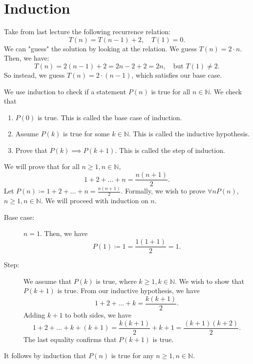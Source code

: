 
\section{Induction}

\begin{eg}
	Take from last lecture the following recurrence relation: \[
		T(n) = T(n - 1) + 2, \quad T(1) = 0
	.\] 
	We can "guess" the solution by looking at the relation. We guess \( T(n) = 2 \cdot n \). Then, we have: \[
		T(n) = 2(n - 1) + 2 = 2n - 2 + 2 = 2n, \quad \text{but } T(1) \neq  2
	.\] 
	So instead, we guess \( T(n) = 2 \cdot (n-1) \), which satisfies our base case.
\end{eg}

We use induction to check if a statement \( P(n) \) is true for all \( n \in \mathbb{N} \). We check that 
\begin{enumerate}
	\item \( P(0) \) is true. This is called the base case of induction.
	\item Assume \( P(k) \) is true for some \( k \in \mathbb{N} \). This is called the inductive hypothesis.
	\item Prove that \( P(k) \implies P(k+1) \). This is called the step of induction.
\end{enumerate}

\begin{eg}
	We will prove that for all \( n \ge 1, n \in \mathbb{N} \), \[
		1 + 2 + \ldots + n = \frac{n(n+1)}{2}
	.\] Let \( P(n) \coloneq 1 + 2 + \ldots  + n = \frac{n(n+1)}{2}\). Formally, we wish to prove \( \forall n P(n) \), \( n \ge 1, n \in \mathbb{N} \). We will proceed with induction on \( n \).
	\begin{description}
		\item[Base case:] \( n = 1 \). Then, we have \[
			P(1) \coloneq 1 = \frac{1(1+1)}{2} = 1
		.\]
		\item[Step:] We assume that \( P(k) \) is true, where \( k \ge 1, k \in \mathbb{N} \). We wish to show that \( P(k+1) \) is true. From our inductive hypothesis, we have \[
			1 + 2 + \ldots + k = \frac{k(k+1)}{2}
		.\] Adding \( k + 1 \) to both sides, we have \[
			1 + 2 + \ldots + k + (k+1) = \frac{k(k+1)}{2} + k + 1 = \frac{(k+1)(k+2)}{2}
		.\] The last equality confirms that \( P(k+1) \) is true.
	\end{description}
	It follows by induction that \( P(n) \) is true for any \( n \ge 1, n \in \mathbb{N} \).
\end{eg}

